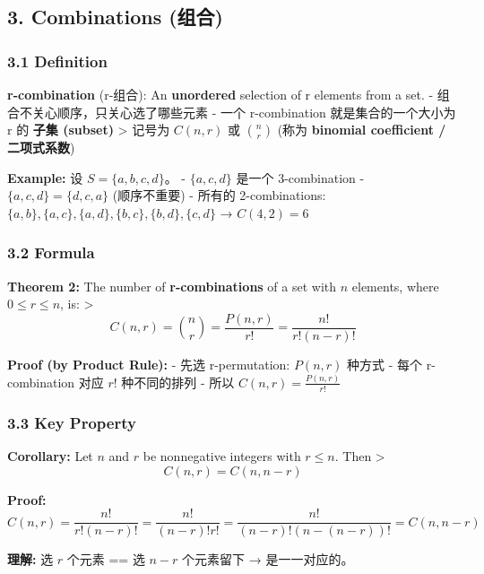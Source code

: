 \documentclass[10pt,a4paper,openany]{ctexbook}
\theoremstyle{definition}
\theoremstyle{remark}
\renewenvironment{quote}
  {\list{}{\leftmargin=1em\rightmargin=0pt\topsep=0.5pt\partopsep=0pt}\item[]}
  {\endlist}
\begin{document}
\subsection{3. Combinations (组合)}

\subsubsection{3.1 Definition}

\begin{quote}
\textbf{r-combination} (r-组合): An \textbf{unordered} selection of r elements from a set.
- 组合不关心顺序，只关心选了哪些元素
- 一个 r-combination 就是集合的一个大小为 r 的 \textbf{子集 (subset)}
>
记号为 $C(n, r)$ 或 $\binom{n}{r}$ (称为 \textbf{binomial coefficient / 二项式系数})

\textbf{Example:} 设 $S = \{a, b, c, d\}$。
- $\{a, c, d\}$ 是一个 3-combination
- $\{a, c, d\} = \{d, c, a\}$ (顺序不重要)
- 所有的 2-combinations: $\{a,b\}, \{a,c\}, \{a,d\}, \{b,c\}, \{b,d\}, \{c,d\}$ → $C(4,2) = 6$

\end{quote}

\subsubsection{3.2 Formula}

\begin{quote}
\textbf{Theorem 2:} The number of \textbf{r-combinations} of a set with $n$ elements, where $0 \le r \le n$, is:
>
\[
C(n, r) = \binom{n}{r} = \frac{P(n, r)}{r!} = \frac{n!}{r!(n-r)!}
\]


\textbf{Proof (by Product Rule):}
- 先选 r-permutation: $P(n, r)$ 种方式
- 每个 r-combination 对应 $r!$ 种不同的排列
- 所以 $C(n, r) = \frac{P(n, r)}{r!}$

\end{quote}

\subsubsection{3.3 Key Property}

\begin{quote}
\textbf{Corollary:} Let $n$ and $r$ be nonnegative integers with $r \le n$. Then
>
\[
C(n, r) = C(n, n-r)
\]


\textbf{Proof:}
\[
C(n, r) = \frac{n!}{r!(n-r)!} = \frac{n!}{(n-r)!r!} = \frac{n!}{(n-r)!(n-(n-r))!} = C(n, n-r)
\]


\textbf{理解:} 选 $r$ 个元素 == 选 $n-r$ 个元素留下 → 是一一对应的。

\end{quote}
\end{document}
